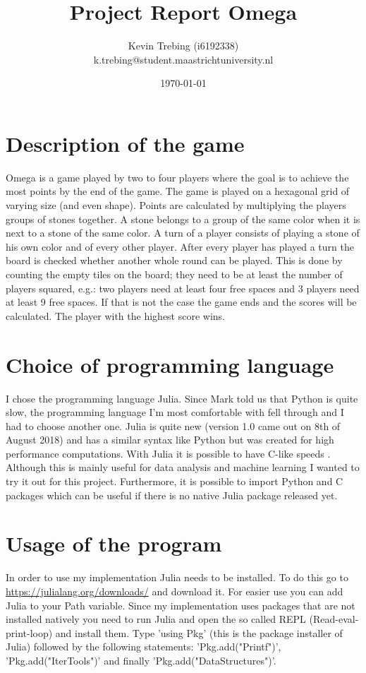 \documentclass[a4paper]{article}
\title{Project Report Omega}
\author{Kevin Trebing (i6192338) \\ k.trebing@student.maastrichtuniversity.nl}
\date{\today}
\begin{document}
\maketitle

\section{Description of the game}
Omega is a game played by two to four players where the goal is to achieve the most points by the end of the game. The game is played on a hexagonal grid of varying size (and even shape). Points are calculated by multiplying the players groups of stones together. A stone belongs to a group of the same color when it is next to a stone of the same color. A turn of a player consists of playing a stone of his own color and of every other player. After every player has played a turn the board is checked whether another whole round can be played. This is done by counting the empty tiles on the board; they need to be at least the number of players squared, e.g.: two players need at least four free spaces and 3 players need at least 9 free spaces. If that is not the case the game ends and the scores will be calculated. The player with the highest score wins.

\section{Choice of programming language}
I chose the programming language Julia. Since Mark told us that Python is quite slow, the programming language I'm most comfortable with fell through and I had to choose another one. Julia is quite new (version 1.0 came out on 8th of August 2018) \cite{julia1} and has a similar syntax like Python but was created for high performance computations. With Julia it is possible to have C-like speeds \cite{benchmarks}. Although this is mainly useful for data analysis and machine learning I wanted to try it out for this project. Furthermore, it is possible to import Python and C packages which can be useful if there is no native Julia package released yet.

\section{Usage of the program}
In order to use my implementation Julia needs to be installed. To do this go to \url{https://julialang.org/downloads/} and download it. For easier use you can add Julia to your Path variable. Since my implementation uses packages that are not installed natively you need to run Julia and open the so called REPL (Read-eval-print-loop) and install them. Type 'using Pkg' (this is the package installer of Julia) followed by the following statements: 'Pkg.add("Printf")', 'Pkg.add("IterTools")' and finally 'Pkg.add("DataStructures")'.
\end{document}
